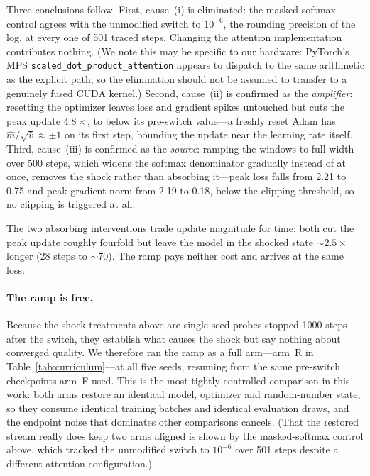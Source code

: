 \documentclass[11pt,a4paper]{article}
\begin{document}
Three conclusions follow. First, cause~(i) is eliminated: the masked-softmax control agrees with the unmodified switch to $10^{-6}$, the rounding precision of the log, at every one of 501 traced steps. Changing the attention implementation contributes nothing. (We note this may be specific to our hardware: PyTorch's MPS \texttt{scaled\_dot\_product\_attention} appears to dispatch to the same arithmetic as the explicit path, so the elimination should not be assumed to transfer to a genuinely fused CUDA kernel.) Second, cause~(ii) is confirmed as the \emph{amplifier}: resetting the optimizer leaves loss and gradient spikes untouched but cuts the peak update $4.8\times$, to below its pre-switch value---a freshly reset Adam has $\hat m/\sqrt{\hat v}\approx\pm1$ on its first step, bounding the update near the learning rate itself. Third, cause~(iii) is confirmed as the \emph{source}: ramping the windows to full width over 500 steps, which widens the softmax denominator gradually instead of at once, removes the shock rather than absorbing it---peak loss falls from 2.21 to 0.75 and peak gradient norm from 2.19 to 0.18, below the clipping threshold, so no clipping is triggered at all.

The two absorbing interventions trade update magnitude for time: both cut the peak update roughly fourfold but leave the model in the shocked state ${\sim}2.5\times$ longer (28 steps to ${\sim}70$). The ramp pays neither cost and arrives at the same loss.

\paragraph{The ramp is free.} Because the shock treatments above are single-seed probes stopped 1000 steps after the switch, they establish what causes the shock but say nothing about converged quality. We therefore ran the ramp as a full arm---arm~R in Table~\ref{tab:curriculum}---at all five seeds, resuming from the same pre-switch checkpoints arm~F used. This is the most tightly controlled comparison in this work: both arms restore an identical model, optimizer and random-number state, so they consume identical training batches and identical evaluation draws, and the endpoint noise that dominates other comparisons cancels. (That the restored stream really does keep two arms aligned is shown by the masked-softmax control above, which tracked the unmodified switch to $10^{-6}$ over 501 steps despite a different attention configuration.)
\end{document}

